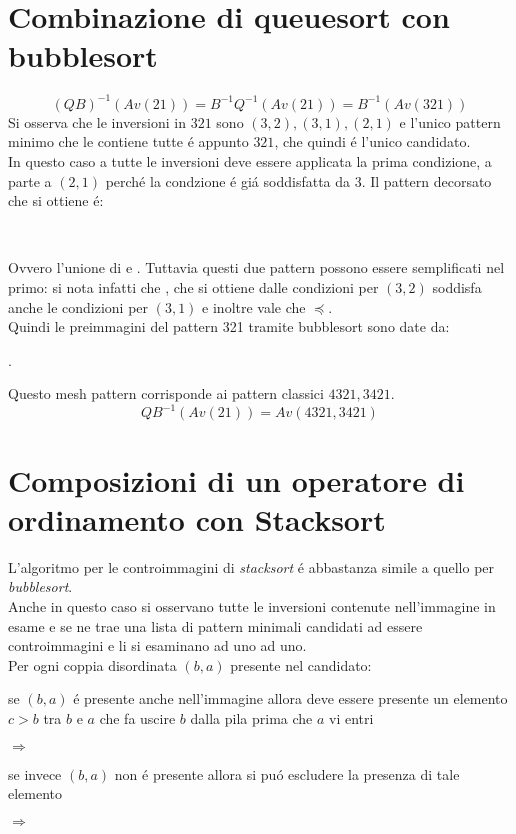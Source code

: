 \section*{Combinazione di queuesort con bubblesort}
$$(QB)^{-1}(Av(21))=B^{-1}Q^{-1}(Av(21))=B^{-1}(Av(321))$$
Si osserva che le inversioni in $321$ sono $(3,2),(3,1),(2,1)$ e l'unico pattern minimo che le contiene tutte \'e appunto $321$, che quindi \'e l'unico candidato.\\
In questo caso a tutte le inversioni deve essere applicata la prima condizione, a parte a $(2,1)$ perch\'e la condzione \'e gi\'a soddisfatta da 3. Il pattern decorsato che si ottiene \'e:
\begin{center}
\\
\end{center}
Ovvero  l'unione di  e . Tuttavia questi due pattern possono essere semplificati nel primo: si nota infatti che , che si ottiene dalle condizioni per $(3,2)$ soddisfa anche le condizioni per $(3,1)$ e inoltre vale che $\preceq$.\\
Quindi le preimmagini del pattern 321 tramite bubblesort sono date da:
\begin{center}
.
\end{center}
Questo mesh pattern corrisponde ai pattern classici $4321,3421$.$$QB^{-1}(Av(21))=Av(4321,3421)$$
\section*{Composizioni di un operatore di ordinamento con Stacksort}
L'algoritmo per le controimmagini di \textit{stacksort} \'e abbastanza simile a quello per \textit{bubblesort}.\\
Anche in questo caso si osservano tutte le inversioni contenute nell'immagine in esame e se ne trae una lista di pattern minimali candidati ad essere controimmagini e li si esaminano ad uno ad uno.\\
Per ogni coppia disordinata $(b,a)$ presente nel candidato: 
\begin{description}
\item se $(b,a)$ \'e presente anche nell'immagine allora deve essere presente un elemento $c>b$ tra $b$ e $a$ che fa uscire $b$ dalla pila prima che $a$ vi entri
\begin{center}
 $\Longrightarrow$ 
\end{center}
\item se invece $(b,a)$ non \'e presente allora si pu\'o escludere la presenza di tale elemento
\begin{center}
 $\Longrightarrow$ 
\end{center}
\end{description}

